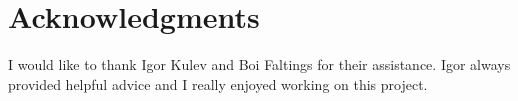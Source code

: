\chapter*{Acknowledgments}
I would like to thank Igor Kulev and Boi Faltings for their assistance.
Igor always provided helpful advice and I really enjoyed working on this project.
